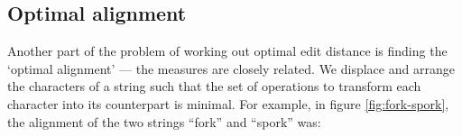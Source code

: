 

\subsection*{Optimal alignment}
Another part of the problem of working out optimal edit distance is
finding the `optimal alignment' --- the measures are closely
related. We displace and arrange the characters of a string such that
the set of operations to transform each character into its counterpart
is minimal. For example, in figure \ref{fig:fork-spork}, the alignment
of the two strings ``fork'' and ``spork'' was:

